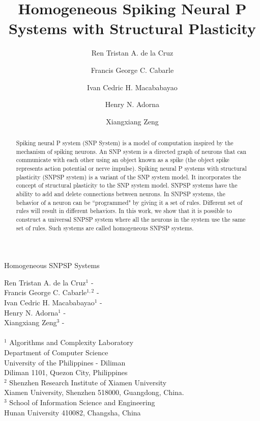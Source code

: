 \documentclass[smallextended]{svjour3}
\begin{document}
\title
{
Homogeneous Spiking Neural P Systems with Structural Plasticity
}

\titlerunning
{
Homogeneous SNPSP Systems
}

\author
{
Ren Tristan A. de la Cruz
\and
Francis George C. Cabarle
\and
Ivan Cedric H. Macababayao
\and
Henry N. Adorna 
\and
Xiangxiang Zeng
}


\institute
{
Ren Tristan A. de la Cruz$^1$     - \mailsa \\
Francis George C. Cabarle$^{1,2}$ - \mailsb \\
Ivan Cedric H. Macababayao$^{1}$  - \mailsc \\
Henry N. Adorna$^1$               - \mailsd \\
Xiangxiang Zeng$^3$               - \mailse \\
\\
$^1$ \at 
Algorithms and Complexity Laboratory    \\
Department of Computer Science          \\
University of the Philippines - Diliman \\
Diliman 1101, Quezon City, Philippines  \\
$^2$ \at
Shenzhen Research Institute of Xiamen University     \\
Xiamen University, Shenzhen 518000, Guangdong, China.\\
$^3$ \at 
School of Information Science and Engineering\\
Hunan University 410082, Changsha, China     \\
}

\maketitle


\begin{abstract}

Spiking neural P system (SNP System) is a model of computation inspired by the mechanism of spiking 
neurons. An SNP system is a directed graph of neurons
that can communicate with each other using an object known as a spike (the object spike represents action potential or nerve impulse).  Spiking neural 
P systems with structural plasticity (SNPSP system) is a variant of the SNP system model. It incorporates the concept of structural plasticity to the
SNP system model. SNPSP systems have the ability to add and delete connections between neurons. In SNPSP systems, the behavior of a neuron can be
``programmed" by giving it a set of rules. Different set of rules will result in different behaviors. In this work, we show that it is possible to
construct a universal SNPSP system where all the neurons in the system use the same set of rules. Such systems are called homogeneous SNPSP systems.

\end{abstract}
\end{document}
